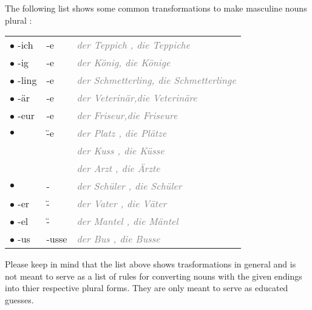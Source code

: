 \documentclass[a4paper,twocolumn,10pt]{article}
\newcommand{\newpar}
{\par \vspace{0.3cm}}
\begin{document}
The following list shows some common transformations to make masculine nouns
plural :



\nolinenumbers

\vspace{0.2cm}

\begin{xtabular}{lll}


		 $\bullet$ -ich  & -e     & \textcolor{gray}{\textit{der Teppich , die Teppiche} }\\
		 $\bullet$ -ig   & -e     & \textcolor{gray}{\textit{der König, die Könige} }\\
		 $\bullet$ -ling & -e     & \textcolor{gray}{\textit{der Schmetterling, die Schmetterlinge} }\\
		 $\bullet$ -är   & -e     & \textcolor{gray}{\textit{der Veterinär,die Veterinäre} }\\
		 $\bullet$ -eur   & -e    & \textcolor{gray}{\textit{der Friseur,die Friseure} }\\
		 $\bullet$       & \"{-}e & \textcolor{gray}{ \textit{der Platz , die Plätze} }\\
		                 &        & \textcolor{gray}{ \textit{der Kuss , die Küsse} }\\
		                 &        & \textcolor{gray}{ \textit{der Arzt , die Ärzte} }\\
		 $\bullet$       & -      & \textcolor{gray}{ \textit{der Schüler , die Schüler} }\\
		 $\bullet$ -er   & \"{-}  & \textcolor{gray}{ \textit{der Vater , die Väter} }\\
		 $\bullet$ -el   & \"{-}  & \textcolor{gray}{ \textit{der Mantel , die Mäntel} }\\
		 $\bullet$ -us   & -usse  & \textcolor{gray}{ \textit{der Bus , die Busse} }\\



\end{xtabular}

\vspace{0.2cm}

\linenumbers


Please keep in mind that the list above shows trasformations in general and is
not meant to serve as a list of rules for converting nouns with the given
endings into thier respective plural forms. They are only meant to serve as
educated guesses.\newpar
\end{document}
